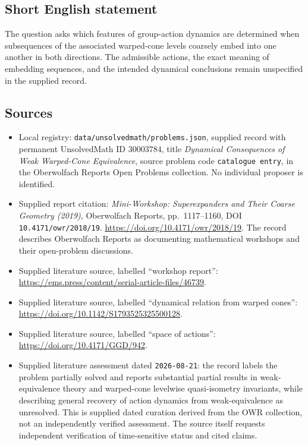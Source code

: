 \documentclass[11pt]{article}
\begin{document}
\subsection{Short English statement}
The question asks which features of group-action dynamics are determined when subsequences of the associated warped-cone levels coarsely embed into one another in both directions. The admissible actions, the exact meaning of embedding sequences, and the intended dynamical conclusions remain unspecified in the supplied record.
\subsection{Sources}
\begin{itemize}
\item Local registry: \texttt{data/unsolvedmath/problems.json}, supplied record with permanent UnsolvedMath ID \(30003784\), title \emph{Dynamical Consequences of Weak Warped-Cone Equivalence}, source problem code \texttt{catalogue entry}, in the Oberwolfach Reports Open Problems collection. No individual proposer is identified.
\item Supplied report citation: \emph{Mini-Workshop: Superexpanders and Their Coarse Geometry (2019)}, Oberwolfach Reports, pp.~1117--1160, DOI \texttt{10.4171/owr/2018/19}. \url{https://doi.org/10.4171/owr/2018/19}. The record describes Oberwolfach Reports as documenting mathematical workshops and their open-problem discussions.
\item Supplied literature source, labelled ``workshop report'': \url{https://ems.press/content/serial-article-files/46739}.
\item Supplied literature source, labelled ``dynamical relation from warped cones'': \url{https://doi.org/10.1142/S1793525325500128}.
\item Supplied literature source, labelled ``space of actions'': \url{https://doi.org/10.4171/GGD/942}.
\item Supplied literature assessment dated \texttt{2026-08-21}: the record labels the problem partially solved and reports substantial partial results in weak-equivalence theory and warped-cone levelwise quasi-isometry invariants, while describing general recovery of action dynamics from weak-equivalence as unresolved. This is supplied dated curation derived from the OWR collection, not an independently verified assessment. The source itself requests independent verification of time-sensitive status and cited claims.
\end{itemize}
\end{document}
